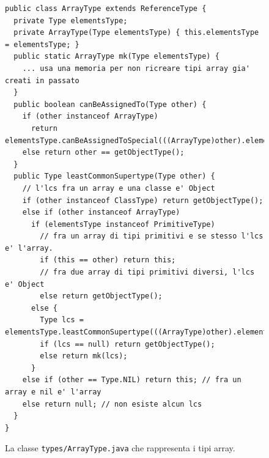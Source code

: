 
\begin{figure}[t]
{\small
\begin{verbatim}
public class ArrayType extends ReferenceType {
  private Type elementsType;
  private ArrayType(Type elementsType) { this.elementsType = elementsType; }
  public static ArrayType mk(Type elementsType) {
    ... usa una memoria per non ricreare tipi array gia' creati in passato
  }
  public boolean canBeAssignedTo(Type other) {
    if (other instanceof ArrayType)
      return elementsType.canBeAssignedToSpecial(((ArrayType)other).elementsType);
    else return other == getObjectType();
  }
  public Type leastCommonSupertype(Type other) {
    // l'lcs fra un array e una classe e' Object
    if (other instanceof ClassType) return getObjectType();
    else if (other instanceof ArrayType)
      if (elementsType instanceof PrimitiveType)
        // fra un array di tipi primitivi e se stesso l'lcs e' l'array.
        if (this == other) return this;
        // fra due array di tipi primitivi diversi, l'lcs e' Object
        else return getObjectType();
      else {
        Type lcs = elementsType.leastCommonSupertype(((ArrayType)other).elementsType);
        if (lcs == null) return getObjectType();
        else return mk(lcs);
      }
    else if (other == Type.NIL) return this; // fra un array e nil e' l'array
    else return null; // non esiste alcun lcs
  }
}
\end{verbatim}
}
\caption{La classe \texttt{types/ArrayType.java} che rappresenta i tipi array.}\label{fig:types.ArrayType}
\end{figure}

